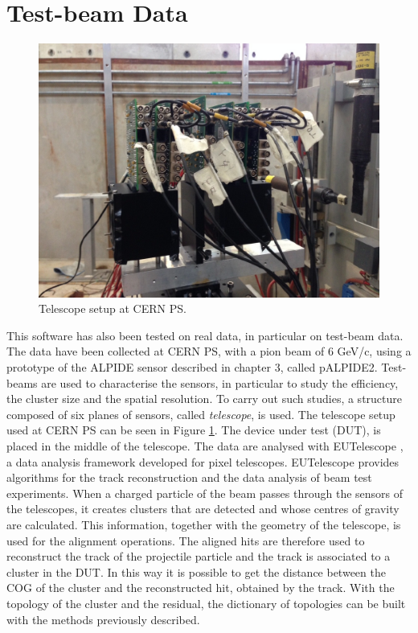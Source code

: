 \section{Test-beam Data}
%
\begin{figure}
  \centering
  \includegraphics[scale=0.22]{figures/telescope.png}
  \caption{Telescope setup at CERN PS.}
  \label{fig:telescope}
\end{figure}
%
This software has also been tested on real data, in particular on test-beam data. The data have been collected at CERN PS, with a pion beam of 6 GeV/c, using a prototype of the ALPIDE sensor described in chapter 3, called pALPIDE2. Test-beams are used to characterise the sensors, in particular to study the efficiency, the cluster size and the spatial resolution. To carry out such studies, a structure composed of six planes of sensors, called \textit{telescope}, is used. The telescope setup used at CERN PS can be seen in Figure \ref{fig:telescope}. The device under test (DUT), is placed in the middle of the telescope. The data are analysed with EUTelescope \cite{eutelescope}, a data analysis framework developed for pixel telescopes. EUTelescope provides algorithms for the track reconstruction and the data analysis of beam test experiments. When a charged particle of the beam passes through the sensors of the telescopes, it creates clusters that are detected and whose centres of gravity are calculated. This information, together with the geometry of the telescope, is used for the alignment operations. The aligned hits are therefore used to reconstruct the track of the projectile particle and the track is associated to a cluster in the DUT. In this way it is possible to get the distance between the COG of the cluster and the reconstructed hit, obtained by the track. With the topology of the cluster and the residual, the dictionary of topologies can be built with the methods previously described.\\
